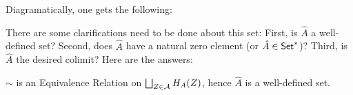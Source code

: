 \documentclass{article}
\begin{document}
Diagramatically, one gets the following:
\begin{center}
\end{center}
There are some clarifications need to be done about this set: First, is $\hat{A}$ a well-defined set? Second, does $\hat{A}$ have a natural zero element (or $\hat{A}\in \mathsf{Set}^*$)? Third, is $\hat{A}$ the desired colimit? Here are the answers:
\begin{lem}
    $\sim$ is an Equivalence Relation on $\bigsqcup_{Z\in\cal{A}}H_A(Z)$, hence $\hat{A}$ is a well-defined set.
\end{lem}
\end{document}
